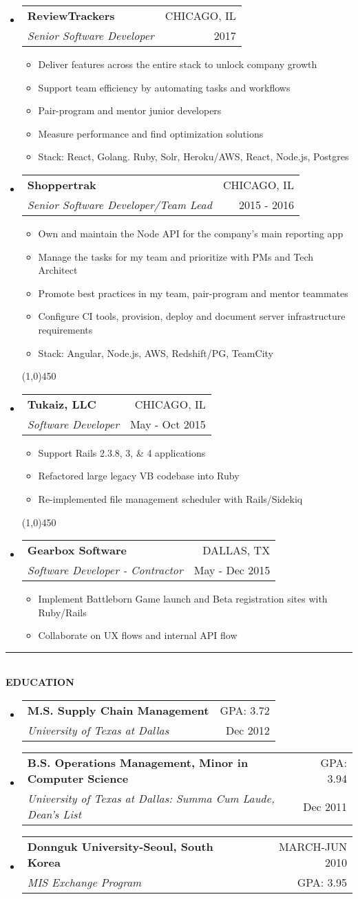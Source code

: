 \documentclass[letterpaper,11pt]{article}
\makeatletter
\newcommand{\resitem}[1]{\item #1 \vspace{-3pt}}
\newcommand{\resheading}[1]{{\large {\textbf{#1 \vphantom{p\^{E}}}}}}
\newcommand{\thinline}{\line(1,0){450}}
\newcommand{\addline}{\noindent\rule{\textwidth}{2pt}}
\newcommand{\ressubheading}[4]{
	\begin{tabular*}{6.5in}{l@{\extracolsep{\fill}}r}
    \textbf{#1} & \MakeUppercase{#2} \\
			\textit{#3} & #4 \\
	\end{tabular*}\vspace{-6pt}}
\makeatother
\begin{document}
\begin{itemize}
\item
  \ressubheading{ReviewTrackers}{Chicago, IL}{Senior Software Developer}{2017}
	\begin{itemize}
    \resitem{Deliver features across the entire stack to unlock company growth}
    \resitem{Support team efficiency by automating tasks and workflows}
    \resitem{Pair-program and mentor junior developers}
    \resitem{Measure performance and find optimization solutions}
        \resitem{Stack: React, Golang. Ruby, Solr, Heroku/AWS, React, Node.js, Postgres}
	\end{itemize}

\item
  \ressubheading{Shoppertrak}{Chicago, IL}{Senior Software Developer/Team Lead}{2015 - 2016}
	\begin{itemize}
    \resitem{Own and maintain the Node API for the company's main reporting app }
    \resitem{Manage the tasks for my team and prioritize with PMs and Tech Architect}
    \resitem{Promote best practices in my team, pair-program and mentor teammates}
    \resitem{Configure CI tools, provision, deploy and document server infrastructure requirements}
     \resitem{Stack: Angular, Node.js, AWS, Redshift/PG, TeamCity}
	\end{itemize}
  \thinline
    


\item
	\ressubheading{Tukaiz, LLC}{Chicago, IL}{Software Developer}{May - Oct 2015}
	\begin{itemize}
		\resitem{Support Rails 2.3.8, 3, \& 4 applications }
		\resitem{Refactored large legacy VB codebase into Ruby}
		\resitem{Re-implemented file management scheduler with Rails/Sidekiq}
	\end{itemize}
  \thinline
    

\item 
	\ressubheading{Gearbox Software}{Dallas, TX}{Software Developer - Contractor}{May - Dec 2015}
	\begin{itemize}
		\resitem{Implement Battleborn Game launch and Beta registration sites with Ruby/Rails}
		\resitem{Collaborate on UX flows and internal API flow}
	\end{itemize}

\end{itemize}
\addline
\\
\resheading{EDUCATION}
\begin{itemize}
\item
	\ressubheading{M.S. Supply Chain Management}{GPA: 3.72}
{University of Texas at Dallas}{Dec 2012}

\item
	\ressubheading{B.S. Operations Management, Minor in Computer Science}
		{GPA: 3.94}{University of Texas at Dallas: Summa Cum Laude, Dean's
			List}{Dec 2011}

\item
	\ressubheading{Donnguk University-Seoul, South Korea}{March-Jun 2010}{MIS
		Exchange Program}{GPA: 3.95}
\end{itemize}
\end{document}
